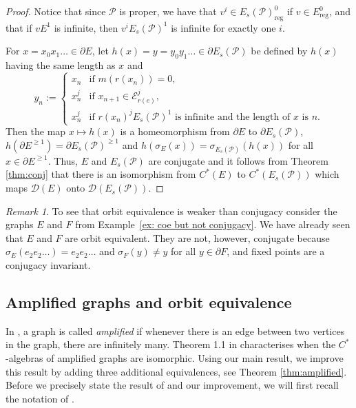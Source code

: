 \documentclass[12pt, a4paper]{amsart}
\numberwithin{equation}{section}
\theoremstyle{definition}
\theoremstyle{remark}
\newtheorem{remark}[thm]{Remark}
\begin{document}
\begin{proof}
	Notice that since $\mathcal{P}$ is proper, we have that $v^i\in E_s(\mathcal{P})^0_{{\operatorname{reg}}}$ if $v\in E^0_{{\operatorname{reg}}}$, and that if $vE^1$ is infinite, then $v^i E_s(\mathcal{P})^1$ is infinite for exactly one $i$. 
	
	For $x=x_0x_1\dots\in\partial E$, let $h(x)=y=y_0y_1\dots\in\partial E_s(\mathcal{P})$ be defined by $h(x)$ having the same length as $x$ and 
	\begin{equation*}
		y_n:=
		\begin{cases}
			x_n&\text{if }m(r(x_n))=0,\\
			x_n^j&\text{if }x_{n+1}\in\mathcal{E}_{r(e)}^j,\\
			x_n^j&\text{if }r(x_n)^j E_s(\mathcal{P})^1\text{ is infinite and the length of }x\text{ is }n.
		\end{cases}
	\end{equation*}
	Then the map $x\mapsto h(x)$ is a homeomorphism from $\partial E$ to $\partial E_s(\mathcal{P})$, $h(\partial E^{\ge 1})=\partial E_s(\mathcal{P})^{\ge 1}$ and $h(\sigma_E(x))=\sigma_{E_s(\mathcal{P})}(h(x))$ for all $x\in\partial E^{\ge 1}$. Thus, $E$ and $E_s(\mathcal{P})$ are conjugate and it follows from Theorem \ref{thm:conj} that there is an isomorphism from $C^*(E)$ to $C^*(E_s(\mathcal{P}))$ which maps $\mathcal{D}(E)$ onto $\mathcal{D}(E_s(\mathcal{P}))$.
\end{proof}

\begin{remark}\label{remark: back to coe but not conjugacy}
To see that orbit equivalence is weaker than conjugacy consider the graphs $E$ 
and $F$ from Example~\ref{ex: coe but not conjugacy}. We have already seen 
that $E$ and $F$ are orbit equivalent. They are not, however, conjugate 
because $\sigma_E(e_2e_2\dots)=e_2e_2\dots$ and $\sigma_F(y)\ne y$ for all 
$y\in\partial F$, and fixed points are a conjugacy invariant.
\end{remark}

\subsection{Amplified graphs and orbit equivalence}\label{subsec: amplified graphs}

In \cite{ERS}, a graph is called \emph{amplified} if whenever there is an edge between two vertices in the graph, there are infinitely many. Theorem 1.1 in \cite{ERS} characterises when the $C^*$-algebras of amplified graphs are isomorphic. Using our main result, we improve this result by adding three additional equivalences, see Theorem \ref{thm:amplified}.  Before we precisely state the result of \cite{ERS} and our improvement, we will first recall the notation of \cite{ERS}. 
\end{document}
